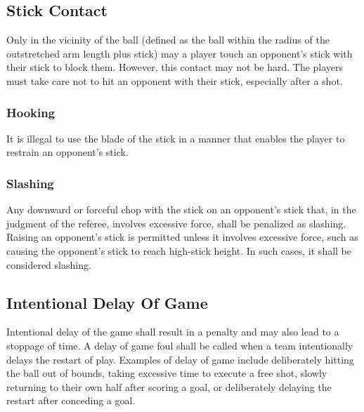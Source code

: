 \subsection{Stick Contact}
Only in the vicinity of the ball (defined as the ball within the radius of the outstretched arm length plus stick) may a player touch an opponent's stick with their stick to block them.
However, this contact may not be hard.
The players must take care not to hit an opponent with their stick, especially after a shot.

\subsubsection{Hooking}
It is illegal to use the blade of the stick in a manner that enables the player to restrain an opponent's stick.

\subsubsection{Slashing}
Any downward or forceful chop with the stick on an opponent’s stick that, in the judgment of the referee, involves excessive force, shall be penalized as slashing.
Raising an opponent’s stick is permitted unless it involves excessive force, such as causing the opponent’s stick to reach high-stick height.
In such cases, it shall be considered slashing.

\subsection{Intentional Delay Of Game}\label{subsec:hockey_delay_game}
Intentional delay of the game shall result in a penalty and may also lead to a stoppage of time.
A delay of game foul shall be called when a team intentionally delays the restart of play.
Examples of delay of game include deliberately hitting the ball out of bounds, taking excessive time to execute a free shot, slowly returning to their own half after scoring a goal, or deliberately delaying the restart after conceding a goal. 

